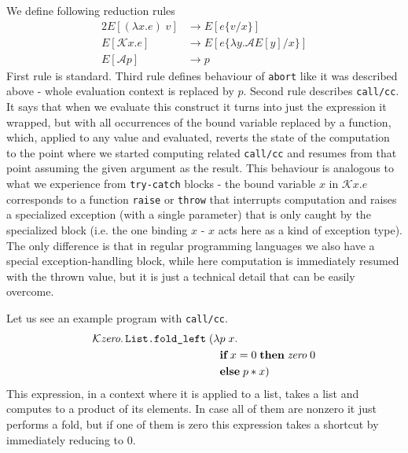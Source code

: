 We define following reduction rules
\begin{alignat*}{2}
  E[(\lambda x.e)\;v] & \longrightarrow E[e\{v / x\}] \\
  E[\mathcal{K} x.e]  & \longrightarrow E[e\{\lambda y.\mathcal{A} E[y] / x\}] \\
  E[\mathcal{A} p]    & \longrightarrow p
\end{alignat*}
First rule is standard. Third rule defines behaviour of \texttt{abort}
like it was described above - whole evaluation context is replaced by $p$.
Second rule describes \texttt{call/cc}. It says that when we evaluate this
construct it turns into just the expression it wrapped, but with all
occurrences of the bound variable replaced by a function, which, applied
to any value and evaluated, reverts the state of the computation to
the point where we started computing related \texttt{call/cc} and
resumes from that point assuming the given argument as the result.
This behaviour is analogous to what we experience from \texttt{try-catch}
blocks - the bound variable $x$ in $\mathcal{K} x.e$ corresponds to a function
\texttt{raise} or \texttt{throw} that interrupts computation and raises
a specialized exception (with a single parameter) that is only caught by
the specialized block (i.e. the one binding $x$ - $x$ acts here as a kind
of exception type). The only difference is that in regular programming
languages we also have a special exception-handling block, while here
computation is immediately resumed with the thrown value, but it is just
a technical detail that can be easily overcome.

Let us see an example program with \texttt{call/cc}.
\begin{alignat*}{2}
  \mathcal{K} \textit{zero} \ldotp \texttt{List.fold\_left}\;(\lambda & p\;x\ldotp \\
  & \textbf{if} \; x = 0 \; \textbf{then} \; \textit{zero}\;0 \\
  & \textbf{else} \; p*x)
\end{alignat*}
This expression, in a context where it is applied to a list, takes a list
and computes to a product of its elements. In case all of them are nonzero
it just performs a fold, but if one of them is zero this expression takes
a shortcut by immediately reducing to $0$.

